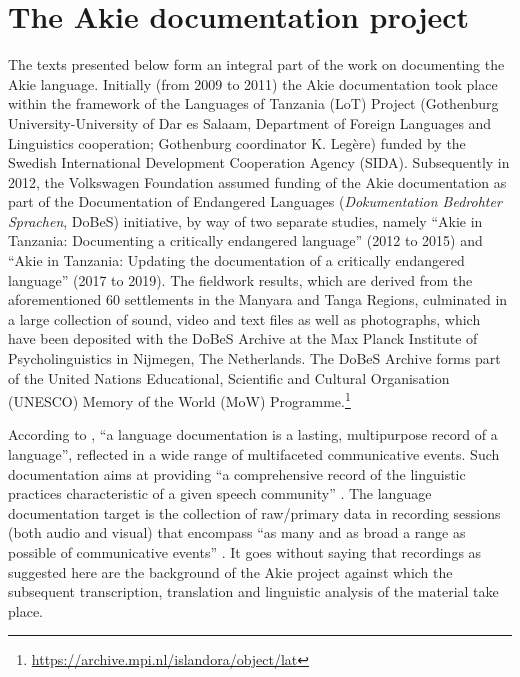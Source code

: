 \documentclass[output=paper,colorlinks,citecolor=brown]{langscibook}
\begin{document}
\section{The Akie documentation project}\label{sec:legere:2}

The texts presented below form an integral part of the work on documenting the Akie language. Initially (from 2009 to 2011) the Akie documentation took place within the framework of the Languages of Tanzania (LoT) Project (Gothenburg University-University of Dar es Salaam, Department of Foreign Languages and Linguistics cooperation; Gothenburg coordinator K. Legère) funded by the Swedish International Development Cooperation Agency (SIDA). Subsequently in 2012, the Volkswagen Foundation assumed funding of the Akie documentation as part of the Documentation of Endangered Languages (\textit{Dokumentation Bedrohter Sprachen}, DoBeS) initiative, by way of two separate studies, namely “Akie in Tanzania: Documenting a critically endangered language” (2012 to 2015) and “Akie in Tanzania: Updating the documentation of a critically endangered language” (2017 to 2019). The fieldwork results, which are derived from the aforementioned 60 settlements in the Manyara and Tanga Regions, culminated in a large collection of sound, video and text files as well as photographs, which have been deposited with the DoBeS Archive at the Max Planck Institute of Psycholinguistics in Nijmegen, The Netherlands. The DoBeS Archive forms part of the United Nations Educational, Scientific and Cultural Organisation (UNESCO) Memory of the World (MoW) Programme.\footnote{\url{https://archive.mpi.nl/islandora/object/lat}}

According to \citet[1]{HimmelmannEtAl2006}, “a language documentation is a lasting, multipurpose record of a language”, reflected in a wide range of multifaceted communicative events. Such documentation aims at providing “a comprehensive record of the linguistic practices characteristic of a given speech community” \citep[166]{Himmelmann1998}. The language documentation target is the collection of raw/primary data in recording sessions (both audio and visual) that encompass “as many and as broad a range as possible of communicative events” \citep[7]{HimmelmannEtAl2006} . It goes without saying that recordings as suggested here are the background of the Akie project against which the subsequent transcription, translation and linguistic analysis of the material take place.
\end{document}
